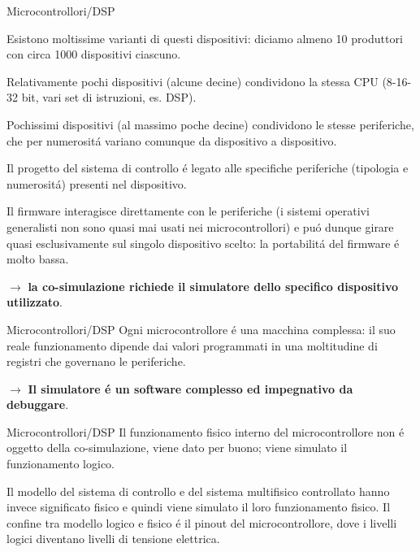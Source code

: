 \documentclass{beamer}
\begin{document}
\begin{frame}{Microcontrollori/DSP}
\begin{itemize}
{\small
\item Esistono moltissime varianti di questi dispositivi: diciamo almeno 10 produttori con circa 1000 dispositivi ciascuno.
\item Relativamente pochi dispositivi (alcune decine) condividono la stessa CPU (8-16-32 bit, vari set di istruzioni, es. DSP).
\item Pochissimi dispositivi (al massimo poche decine) condividono le stesse periferiche, che per numerosit\'a variano comunque da dispositivo a dispositivo.
\item Il progetto del sistema di controllo \'e legato alle specifiche periferiche (tipologia e numerosit\'a) presenti nel dispositivo.
\item Il firmware interagisce direttamente con le periferiche (i sistemi operativi generalisti non sono quasi mai usati nei microcontrollori) e 
pu\'o dunque girare quasi esclusivamente sul singolo dispositivo scelto: la portabilit\'a del firmware \'e molto bassa.
}
\end{itemize}


$\rightarrow$ \textbf{la co-simulazione richiede il simulatore dello specifico dispositivo utilizzato}.
\end{frame}

\begin{frame}{Microcontrollori/DSP}
Ogni microcontrollore \'e una macchina complessa: il suo reale funzionamento dipende dai valori programmati in una moltitudine
di registri che governano le periferiche.

\bigskip

$\rightarrow$ \textbf{Il simulatore \'e un software complesso ed impegnativo da debuggare}.
\end{frame}

\begin{frame}{Microcontrollori/DSP}
Il funzionamento fisico interno del microcontrollore non \'e oggetto della co-simulazione, viene dato per buono; viene simulato il funzionamento logico.

\bigskip

Il modello del sistema di controllo e del sistema multifisico controllato hanno invece significato fisico e quindi viene simulato il loro
funzionamento fisico. Il confine tra modello logico e fisico \'e il pinout del microcontrollore, dove i livelli logici diventano
livelli di tensione elettrica.
\end{frame}
\end{document}

